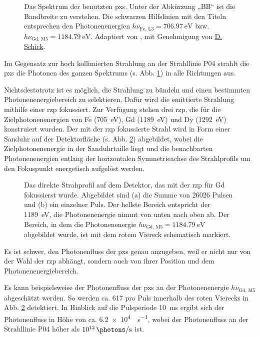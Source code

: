 \begin{figure}[H]
    \centering
    
    \caption{Das Spektrum der benutzten \gls{pxs}. Unter der Abkürzung „BB“ ist die Bandbreite zu verstehen. Die schwarzen Hilfslinien mit den Titeln entsprechen den Photonenenergien $h\nu_{\text{Fe, L3}} = \SI{706.97}{\eV}$ bzw. $h\nu_{\text{Gd, M5}} = \SI{1184,79}{\eV}$. Adaptiert von \cite{schick_laser-driven_2021}, mit Genehmigung von \href{https://orcid.org/0000-0001-7988-6489}{D. Schick}.}
    \label{fig:pxs_spectrum}
\end{figure}
\noindent
Im Gegensatz zur hoch kollimierten Strahlung an der Strahllinie P04 strahlt die \gls{pxs} die Photonen des ganzen Spektrums (s. Abb. \ref{fig:pxs_spectrum}) in alle Richtungen aus.

\noindent
Nichtsdestotrotz ist es möglich, die Strahlung zu bündeln und einen bestimmten Photonenenergiebereich zu selektieren. Dafür wird die emittierte Strahlung mithilfe einer \gls{rzp} fokussiert. Zur Verfügung stehen drei \gls{rzp}, die für die Zielphotonenenergien von Fe (\SI{705}{\eV}), Gd (\SI{1189}{\eV}) und Dy (\SI{1292}{\eV}) konstruiert wurden. Der mit der \gls{rzp} fokussierte Strahl wird in Form einer Sanduhr auf der Detektorfläche (s. Abb. \ref{fig:butterfly_moench}) abgebildet, wobei die Zielphotonenenergie in der Sanduhrtaille liegt und die benachbarten Photonenenergien entlang der horizontalen Symmetrieachse des Strahlprofils um den Fokuspunkt energetisch aufgelöst werden.
\begin{figure}[H]
    \centering
    
    \label{fig:butterfly_moench_sum}
    \caption{Das direkte Strahprofil auf dem Detektor, das mit der \gls{rzp} für Gd fokussierst wurde. Abgebildet sind (a) die Summe von 26026 Pulsen und (b) ein einzelner Puls. Der hellste Bereich entspricht der \SI{1189}{\eV}, die Photonenenergie nimmt von unten nach oben ab. Der Bereich, in dem die Photonenenergie $h\nu_{\text{Gd, M5}} = \SI{1184,79}{\eV}$ abgebildet wurde, ist mit dem rotem Viereck schematisch markiert.}
    \label{fig:butterfly_moench}
\end{figure}
\noindent
Es ist schwer, den Photonenfluss der \gls{pxs} genau anzugeben, weil er nicht nur von der Wahl der \gls{rzp} abhängt, sondern auch von ihrer Position und dem  Photonenenergiebereich.

\noindent
Es kann beispielsweise der Photonenfluss der \gls{pxs} an der Photonenenergie $h\nu_\text{Gd, M5}$ abgeschätzt werden. So werden ca. \SI{617}{\photons} pro Puls innerhalb des roten Vierecks in Abb. \ref{fig:butterfly_moench} detektiert. In Hinblick auf die Pulsperiode \SI{10}{\milli\second} ergibt sich der Photonenfluss in Höhe von ca. \SI{6.2e4}{\photons\per\second}, wobei der Photonenfluss an der Strahllinie P04 höher als $\SI{1e12}{\photons\per\second}$ ist.

